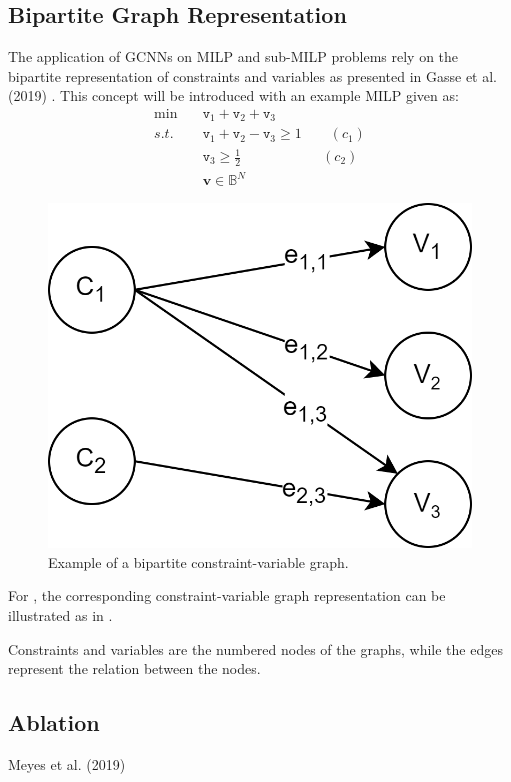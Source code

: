 \subsection{Bipartite Graph Representation}

The application of \gls{GCNN}s on \gls{MILP} and sub-\gls{MILP} problems rely on the bipartite representation of constraints and variables as presented in Gasse et al. (2019) \cite{gasse2019exact}.
This concept will be introduced with an example \gls{MILP} given as:
\begin{align}\label{eq:bipex}
    \min \quad &\texttt{v}_1 + \texttt{v}_2 + \texttt{v}_3\\ 
    s.t. \quad &\texttt{v}_1 + \texttt{v}_2 - \texttt{v}_3 \geq 1 \qquad (c_1)\nonumber\\
    &\texttt{v}_3 \geq \frac{1}{2}\qquad\qquad\quad\;\,\,\, (c_2)\nonumber\\
    &\mathbf{v} \in \mathbb{B}^N \nonumber
\end{align}

\begin{figure}
    \centering
    \includegraphics[width=0.45\linewidth]{img/bipartite_zoom.png}
    \caption{Example of a bipartite constraint-variable graph.}
    \label{fig:bipartite}
\end{figure}

For , the corresponding constraint-variable graph representation can be illustrated as in
.

Constraints and variables are the numbered nodes of the graphs, while the edges represent the relation between the nodes. 




\subsection{Ablation}

Meyes et al. (2019) \cite{meyes2019ablation}









